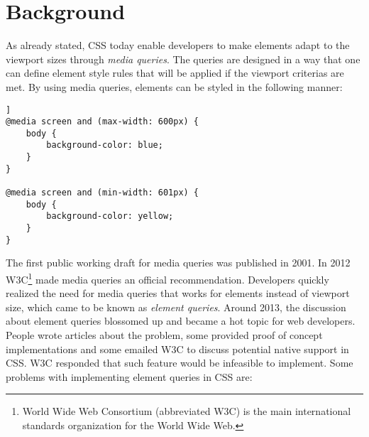 \documentclass[oneside,a4paper,11pt]{kth-mag}
\begin{document}
\section*{Background}
As already stated, CSS today enable developers to make elements adapt to the viewport sizes through \emph{media queries}. The queries are designed in a way that one can define element style rules that will be applied if the viewport criterias are met. By using media queries, elements can be styled in the following manner:
\begin{lstlisting}[frame=single, caption= {The above CSS styles the body of the website blue if the viewport is less or equal to 600 pixels wide, and yellow otherwise.},captionpos=b]]
@media screen and (max-width: 600px) {
    body {
        background-color: blue;
    }
}

@media screen and (min-width: 601px) {
    body {
        background-color: yellow;
    }
}
\end{lstlisting}
The first public working draft for media queries was published in 2001. In 2012 W3C\footnote{World Wide Web Consortium (abbreviated W3C) is the main international standards organization for the World Wide Web.} made media queries an official recommendation. Developers quickly realized the need for media queries that works for elements instead of viewport size, which came to be known as \emph{element queries}. Around 2013, the discussion about element queries blossomed up and became a hot topic for web developers. People wrote articles about the problem, some provided proof of concept implementations and some emailed W3C to discuss potential native support in CSS. W3C responded that such feature would be infeasible to implement. Some problems with implementing element queries in CSS are:
\end{document}
